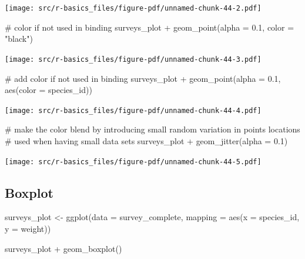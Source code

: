 \documentclass[
  letterpaper,
  DIV=11,
  numbers=noendperiod]{scrreprt}
\newenvironment{Shaded}{\begin{snugshade}}{\end{snugshade}}
\newcommand{\AttributeTok}[1]{\textcolor[rgb]{0.40,0.45,0.13}{#1}}
\newcommand{\CommentTok}[1]{\textcolor[rgb]{0.37,0.37,0.37}{#1}}
\newcommand{\FloatTok}[1]{\textcolor[rgb]{0.68,0.00,0.00}{#1}}
\newcommand{\FunctionTok}[1]{\textcolor[rgb]{0.28,0.35,0.67}{#1}}
\newcommand{\NormalTok}[1]{\textcolor[rgb]{0.00,0.23,0.31}{#1}}
\newcommand{\OtherTok}[1]{\textcolor[rgb]{0.00,0.23,0.31}{#1}}
\newcommand{\SpecialCharTok}[1]{\textcolor[rgb]{0.37,0.37,0.37}{#1}}
\newcommand{\StringTok}[1]{\textcolor[rgb]{0.13,0.47,0.30}{#1}}
\begin{document}
\texttt{[image: src/r-basics\_files/figure-pdf/unnamed-chunk-44-2.pdf]}

\begin{Shaded}
\begin{Highlighting}[]
\CommentTok{\# color if not used in binding}
\NormalTok{surveys\_plot }\SpecialCharTok{+} \FunctionTok{geom\_point}\NormalTok{(}\AttributeTok{alpha =} \FloatTok{0.1}\NormalTok{, }\AttributeTok{color =} \StringTok{"black"}\NormalTok{)}
\end{Highlighting}
\end{Shaded}

\texttt{[image: src/r-basics\_files/figure-pdf/unnamed-chunk-44-3.pdf]}

\begin{Shaded}
\begin{Highlighting}[]
\CommentTok{\# add color if not used in binding}
\NormalTok{surveys\_plot }\SpecialCharTok{+} \FunctionTok{geom\_point}\NormalTok{(}\AttributeTok{alpha =} \FloatTok{0.1}\NormalTok{, }\FunctionTok{aes}\NormalTok{(}\AttributeTok{color =}\NormalTok{ species\_id))}
\end{Highlighting}
\end{Shaded}

\texttt{[image: src/r-basics\_files/figure-pdf/unnamed-chunk-44-4.pdf]}

\begin{Shaded}
\begin{Highlighting}[]
\CommentTok{\# make the color blend by introducing small random variation in points locations}
\CommentTok{\# used when having small data sets}
\NormalTok{surveys\_plot }\SpecialCharTok{+} \FunctionTok{geom\_jitter}\NormalTok{(}\AttributeTok{alpha =} \FloatTok{0.1}\NormalTok{)}
\end{Highlighting}
\end{Shaded}

\texttt{[image: src/r-basics\_files/figure-pdf/unnamed-chunk-44-5.pdf]}

\subsection{Boxplot}\label{boxplot}

\begin{Shaded}
\begin{Highlighting}[]
\NormalTok{surveys\_plot }\OtherTok{\textless{}{-}} \FunctionTok{ggplot}\NormalTok{(}\AttributeTok{data =}\NormalTok{ survey\_complete, }
    \AttributeTok{mapping =} \FunctionTok{aes}\NormalTok{(}\AttributeTok{x =}\NormalTok{ species\_id, }\AttributeTok{y =}\NormalTok{ weight))}

\NormalTok{surveys\_plot }\SpecialCharTok{+} \FunctionTok{geom\_boxplot}\NormalTok{()}
\end{Highlighting}
\end{Shaded}
\end{document}

